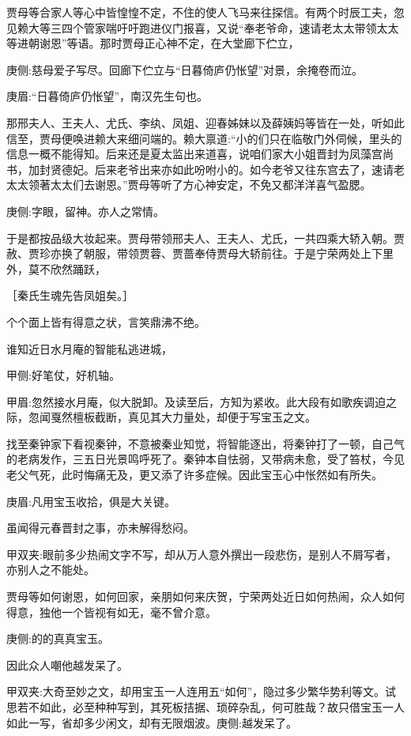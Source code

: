 \begin{parag}
    贾母等合家人等心中皆惶惶不定，不住的使人飞马来往探信。有两个时辰工夫，忽见赖大等三四个管家喘吁吁跑进仪门报喜，又说“奉老爷命，速请老太太带领太太等进朝谢恩”等语。那时贾母正心神不定，在大堂廊下伫立，\begin{note}庚侧:慈母爱子写尽。回廊下伫立与“日暮倚庐仍怅望”对景，余掩卷而泣。\end{note}\begin{note}庚眉:“日暮倚庐仍怅望”，南汉先生句也。\end{note}那邢夫人、王夫人、尤氏、李纨、凤姐、迎春姊妹以及薛姨妈等皆在一处，听如此信至，贾母便唤进赖大来细问端的。赖大禀道:“小的们只在临敬门外伺候，里头的信息一概不能得知。后来还是夏太监出来道喜，说咱们家大小姐晋封为凤藻宫尚书，加封贤德妃。后来老爷出来亦如此吩咐小的。如今老爷又往东宫去了，速请老太太领著太太们去谢恩。”贾母等听了方心神安定，不免又都洋洋喜气盈腮。\begin{note}庚侧:字眼，留神。亦人之常情。\end{note}于是都按品级大妆起来。贾母带领邢夫人、王夫人、尤氏，一共四乘大轿入朝。贾赦、贾珍亦换了朝服，带领贾蓉、贾蔷奉侍贾母大轿前往。于是宁荣两处上下里外，莫不欣然踊跃，\begin{note}［秦氏生魂先告凤姐矣。］\end{note}个个面上皆有得意之状，言笑鼎沸不绝。
\end{parag}


\begin{parag}
    谁知近日水月庵的智能私逃进城，\begin{note}甲侧:好笔仗，好机轴。\end{note}\begin{note}甲眉:忽然接水月庵，似大脱卸。及读至后，方知为紧收。此大段有如歌疾调迫之际，忽闻戛然檀板截断，真见其大力量处，却便于写宝玉之文。\end{note}找至秦钟家下看视秦钟，不意被秦业知觉，将智能逐出，将秦钟打了一顿，自己气的老病发作，三五日光景鸣呼死了。秦钟本自怯弱，又带病未愈，受了笞杖，今见老父气死，此时悔痛无及，更又添了许多症候。因此宝玉心中怅然如有所失。\begin{note}庚眉:凡用宝玉收拾，俱是大关键。\end{note}虽闻得元春晋封之事，亦未解得愁闷。\begin{note}甲双夹:眼前多少热闹文字不写，却从万人意外撰出一段悲伤，是别人不屑写者，亦别人之不能处。\end{note}贾母等如何谢恩，如何回家，亲朋如何来庆贺，宁荣两处近日如何热闹，众人如何得意，独他一个皆视有如无，毫不曾介意。\begin{note}庚侧:的的真真宝玉。\end{note}因此众人嘲他越发呆了。\begin{note}甲双夹:大奇至妙之文，却用宝玉一人连用五“如何”，隐过多少繁华势利等文。试思若不如此，必至种种写到，其死板拮据、琐碎杂乱，何可胜哉？故只借宝玉一人如此一写，省却多少闲文，却有无限烟波。庚侧:越发呆了。\end{note}
\end{parag}


